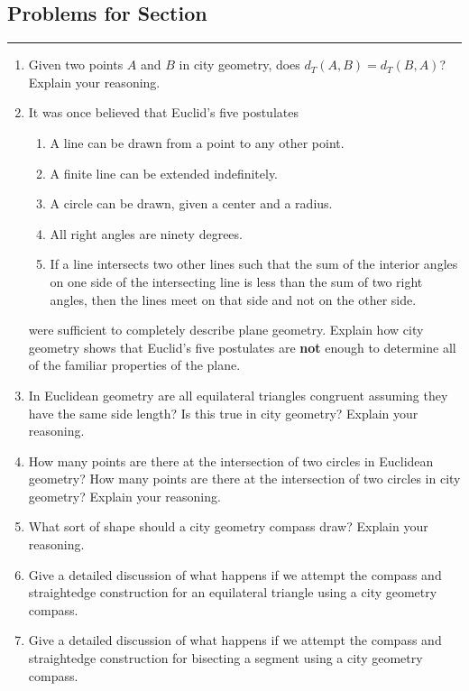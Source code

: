 \subsection*{Problems for Section~\thesection}\hrule\vspace{1ex}
\begin{enumerate}
\item Given two points $A$ and $B$ in city geometry, does $d_T(A,B) =
  d_T(B,A)$? Explain your reasoning.
\item It was once believed that Euclid's five postulates
\begin{enumerate}
\item A line can be drawn from a point to any other point.
\item A finite line can be extended indefinitely.
\item A circle can be drawn, given a center and a radius.
\item All right angles are ninety degrees. 
\item If a line intersects two other lines such that the sum of the
  interior angles on one side of the intersecting line is less than
  the sum of two right angles, then the lines meet on that side and
  not on the other side.
\end{enumerate}
were sufficient to completely describe plane geometry.  Explain how
city geometry shows that Euclid's five postulates are \textbf{not}
enough to determine all of the familiar properties of the plane.

\item In Euclidean geometry are all equilateral triangles congruent
  assuming they have the same side length? Is this true in city
  geometry? Explain your reasoning.

\item How many points are there at the intersection of two circles in
  Euclidean geometry? How many points are there at the intersection of
  two circles in city geometry? Explain your reasoning.

\item What sort of shape should a city geometry compass draw? Explain
  your reasoning.

\item Give a detailed discussion of what happens if we attempt the
  compass and straightedge construction for an equilateral triangle
  using a city geometry compass.

\item Give a detailed discussion of what happens if we attempt the
  compass and straightedge construction for bisecting a segment using
  a city geometry compass.


\end{enumerate}

